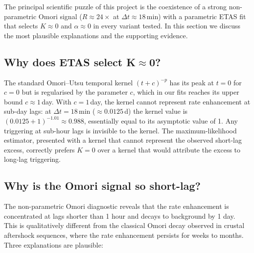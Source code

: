 \documentclass[10pt,a4paper,twocolumn]{article}
\begin{document}
The principal scientific puzzle of this project is the coexistence of a strong non-parametric Omori signal ($R\approx24\times$ at $\Delta t\approx18$\,min) with a parametric ETAS fit that selects $K\approx0$ and $\alpha\approx0$ in every variant tested. In this section we discuss the most plausible explanations and the supporting evidence.

\subsection{Why does ETAS select K$\approx$0?}

The standard Omori--Utsu temporal kernel $(t+c)^{-p}$ has its peak at $t=0$ for $c=0$ but is regularised by the parameter $c$, which in our fits reaches its upper bound $c\approx1$\,day. With $c=1$\,day, the kernel cannot represent rate enhancement at sub-day lags: at $\Delta t=18$\,min ($\approx0.0125$\,d) the kernel value is $(0.0125 + 1)^{-1.01} \approx 0.988$, essentially equal to its asymptotic value of 1. Any triggering at sub-hour lags is invisible to the kernel. The maximum-likelihood estimator, presented with a kernel that cannot represent the observed short-lag excess, correctly prefers $K=0$ over a kernel that would attribute the excess to long-lag triggering.

\subsection{Why is the Omori signal so short-lag?}

The non-parametric Omori diagnostic reveals that the rate enhancement is concentrated at lags shorter than 1 hour and decays to background by 1 day. This is qualitatively different from the classical Omori decay observed in crustal aftershock sequences, where the rate enhancement persists for weeks to months. Three explanations are plausible:
\end{document}
